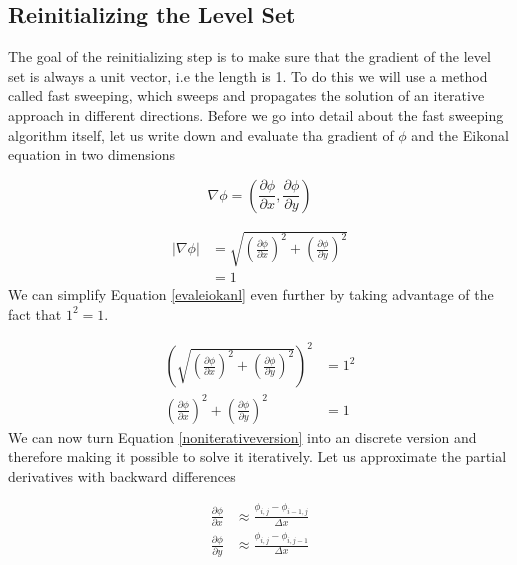 \subsection{Reinitializing the Level Set}

The goal of the reinitializing step is to make sure that the gradient of the level set is always a unit vector, i.e the length is 1. To do this we will use a method called fast sweeping, which sweeps and propagates the solution of an iterative approach in different directions. Before we go into detail about the fast sweeping algorithm itself, let us write down and evaluate tha gradient of $\phi$ and the Eikonal equation in two dimensions

\begin{equation}
\nabla \phi = (\frac{\partial \phi}{\partial x}, \frac{\partial \phi}{\partial y})
\end{equation}

\begin{equation}
\begin{split}
|\nabla \phi| &= \sqrt{{(\frac{\partial \phi}{\partial x})}^2 + {(\frac{\partial \phi}{\partial y})}^2} \\
&= 1
\end{split}
\label{evaleiokanl}
\end{equation}
\noindent
We can simplify Equation \ref{evaleiokanl} even further by taking advantage of the fact that $1^2 = 1$.

\begin{equation}
\begin{split}
{(\sqrt{{(\frac{\partial \phi}{\partial x})}^2 + {(\frac{\partial \phi}{\partial y})}^2})}^2 &= 1^2 \\
{(\frac{\partial \phi}{\partial x})}^2 + {(\frac{\partial \phi}{\partial y})}^2 &= 1
\end{split}
\label{noniterativeversion}
\end{equation}
\noindent
We can now turn Equation \ref{noniterativeversion} into an discrete version and therefore making it possible to solve it iteratively. Let us approximate the partial derivatives with backward differences

\begin{equation}
\begin{split}
\frac{\partial \phi}{\partial x} &\approx \frac{\phi_{i,j} - \phi_{i-1,j}}{\Delta x} \\
\frac{\partial \phi}{\partial y} &\approx \frac{\phi_{i,j} - \phi_{i,j-1}}{\Delta x}
\end{split}
\label{phiapproxeq}
\end{equation}

